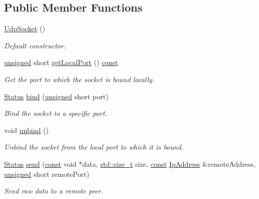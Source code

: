 \subsection*{Public Member Functions}
\begin{DoxyCompactItemize}
\item 
\hyperlink{classsf_1_1_udp_socket_abb10725e26dee9d3a8165fe87ffb71bb}{Udp\-Socket} ()
\begin{DoxyCompactList}\small\item\em Default constructor. \end{DoxyCompactList}\item 
\hyperlink{curses_8priv_8h_aca40206900cfc164654362fa8d4ad1e6}{unsigned} short \hyperlink{classsf_1_1_udp_socket_a8ce625debd4b1f885366a69faa270086}{get\-Local\-Port} () \hyperlink{term__entry_8h_a57bd63ce7f9a353488880e3de6692d5a}{const} 
\begin{DoxyCompactList}\small\item\em Get the port to which the socket is bound locally. \end{DoxyCompactList}\item 
\hyperlink{classsf_1_1_socket_a51bf0fd51057b98a10fbb866246176dc}{Status} \hyperlink{classsf_1_1_udp_socket_ab0bf8d32849836f92beb2fd734565481}{bind} (\hyperlink{curses_8priv_8h_aca40206900cfc164654362fa8d4ad1e6}{unsigned} short port)
\begin{DoxyCompactList}\small\item\em Bind the socket to a specific port. \end{DoxyCompactList}\item 
void \hyperlink{classsf_1_1_udp_socket_a2c4abb8102a1bd31f51fcfe7f15427a3}{unbind} ()
\begin{DoxyCompactList}\small\item\em Unbind the socket from the local port to which it is bound. \end{DoxyCompactList}\item 
\hyperlink{classsf_1_1_socket_a51bf0fd51057b98a10fbb866246176dc}{Status} \hyperlink{classsf_1_1_udp_socket_a664ab8f26f37c21cc4de1b847c2efcca}{send} (\hyperlink{term__entry_8h_a57bd63ce7f9a353488880e3de6692d5a}{const} void $\ast$data, \hyperlink{nc__alloc_8h_a7b60c5629e55e8ec87a4547dd4abced4}{std\-::size\-\_\-t} size, \hyperlink{term__entry_8h_a57bd63ce7f9a353488880e3de6692d5a}{const} \hyperlink{classsf_1_1_ip_address}{Ip\-Address} \&remote\-Address, \hyperlink{curses_8priv_8h_aca40206900cfc164654362fa8d4ad1e6}{unsigned} short remote\-Port)
\begin{DoxyCompactList}\small\item\em Send raw data to a remote peer. \end{DoxyCompactList}\item 

\end{DoxyCompactItemize}
